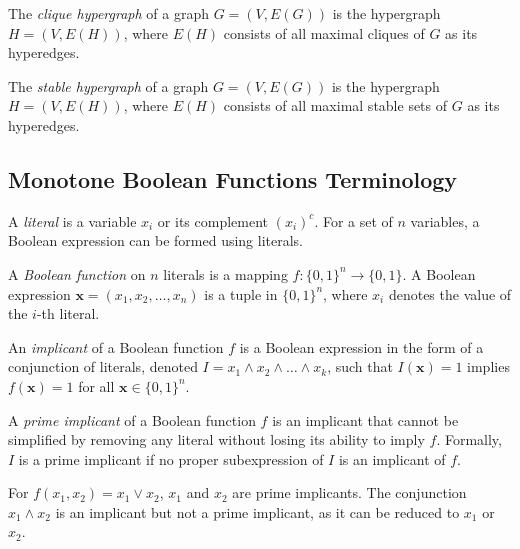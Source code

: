 \begin{definition}\label{def:clique}
The \emph{clique hypergraph} of a graph $G=(V,E(G))$ is the hypergraph $H=(V,E(H))$, where $E(H)$ consists of all maximal cliques of $G$ as its hyperedges.
\end{definition}

\begin{definition}
The \emph{stable hypergraph} of a graph $G=(V,E(G))$ is the hypergraph $H=(V,E(H))$, where $E(H)$ consists of all maximal stable sets of $G$ as its hyperedges.
\end{definition}

\subsection{Monotone Boolean Functions Terminology}

\begin{definition}
A \emph{literal} is a variable $x_i$ or its complement $(x_i)^c$. For a set of $n$ variables, a Boolean expression can be formed using literals.
\end{definition}

\begin{definition}
A \emph{Boolean function} on $n$ literals is a mapping $f:\{0,1\}^n\to\{0,1\}$. A Boolean expression $\mathbf{x}=(x_1,x_2,\dots,x_n)$ is a tuple in $\{0,1\}^n$, where $x_i$ denotes the value of the $i$-th literal.
\end{definition}

\begin{definition}
An \emph{implicant} of a Boolean function $f$ is a Boolean expression in the form of a conjunction of literals, denoted $I=x_1\wedge x_2\wedge\dots\wedge x_k$, such that $I(\mathbf{x})=1$ implies $f(\mathbf{x})=1$ for all $\mathbf{x}\in\{0,1\}^n$.
\end{definition}

\begin{definition}
A \emph{prime implicant} of a Boolean function $f$ is an implicant that cannot be simplified by removing any literal without losing its ability to imply $f$. Formally, $I$ is a prime implicant if no proper subexpression of $I$ is an implicant of $f$.
\end{definition}

\begin{example}
For $f(x_1,x_2)=x_1\vee x_2$, $x_1$ and $x_2$ are prime implicants. The conjunction $x_1\wedge x_2$ is an implicant but not a prime implicant, as it can be reduced to $x_1$ or $x_2$.
\end{example}

